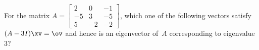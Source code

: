 \begin{activity}
For the matrix \(A=\begin{bmatrix}2&0&-1
\\-5&3&-5
\\5&-2&-2\end{bmatrix}\), which one of the following vectors satisfy \((A-3I)\xv=\ov\) and hence is an eigenvector of~\(A\) corresponding to eigenvalue~\(3\)?
\end{activity}




